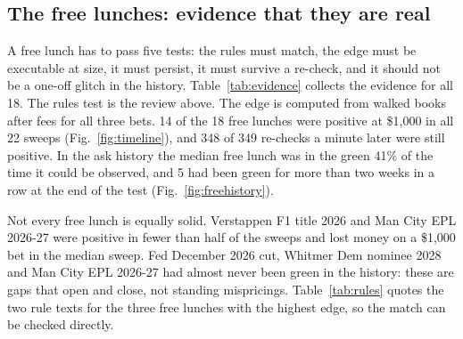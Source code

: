 \documentclass[5p,letterpaper]{elsarticle}
\begin{document}
\subsection{The free lunches: evidence that they are real}

A free lunch has to pass five tests: the rules must match, the edge must be executable at size, it must persist, it must survive a re-check, and it should not be a one-off glitch in the history. Table~\ref{tab:evidence} collects the evidence for all 18. The rules test is the review above. The edge is computed from walked books after fees for all three bets. 14 of the 18 free lunches were positive at \$1,000 in all 22 sweeps (Fig.~\ref{fig:timeline}), and 348 of 349 re-checks a minute later were still positive. In the ask history the median free lunch was in the green 41\% of the time it could be observed, and 5 had been green for more than two weeks in a row at the end of the test (Fig.~\ref{fig:freehistory}).

Not every free lunch is equally solid. Verstappen F1 title 2026 and Man City EPL 2026-27 were positive in fewer than half of the sweeps and lost money on a \$1,000 bet in the median sweep. Fed December 2026 cut, Whitmer Dem nominee 2028 and Man City EPL 2026-27 had almost never been green in the history: these are gaps that open and close, not standing mispricings. Table~\ref{tab:rules} quotes the two rule texts for the three free lunches with the highest edge, so the match can be checked directly.
\end{document}
